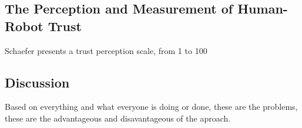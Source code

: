 \subsection{The Perception and Measurement of Human-Robot Trust\cite{Schaefer2009}}

Schaefer presents a trust perception scale, from 1 to 100%





\subsection{Discussion}
\label{subsec:RelWorkDiscussion}

Based on everything and what everyone is doing or done, these are the problems, these are the advantageous and disavantageous of the aproach.